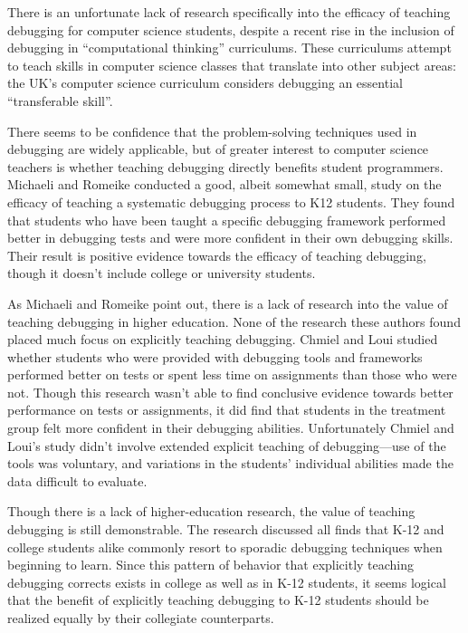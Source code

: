 \documentclass[12pt]{article}
\begin{document}
There is an unfortunate lack of research specifically into the
efficacy of teaching debugging for computer science students, despite
a recent rise in the inclusion of debugging in ``computational
thinking'' curriculums\cite{10.1145/3361721.3361724}.  These
curriculums attempt to teach skills in computer science classes that
translate into other subject areas: the UK's computer science
curriculum considers debugging an essential ``transferable
skill''\cite{10.1145/2602484}.\par

There seems to be confidence that the problem-solving techniques used
in debugging are widely applicable, but of greater interest to
computer science teachers is whether teaching debugging directly
benefits student programmers.  Michaeli and Romeike conducted a good,
albeit somewhat small, study on the efficacy of teaching a systematic
debugging process to K12 students.  They found that students who have
been taught a specific debugging framework performed better in
debugging tests and were more confident in their own debugging
skills\cite{10.1145/3361721.3361724}.  Their result is positive
evidence towards the efficacy of teaching debugging, though it doesn't
include college or university students.\par

As Michaeli and Romeike point out, there is a lack of research into
the value of teaching debugging in higher education.  None of the
research these authors found placed much focus on explicitly teaching
debugging.  Chmiel and Loui studied whether students who were provided
with debugging tools and frameworks performed better on tests or spent
less time on assignments than those who were
not\cite{10.1145/971300.971310}.  Though this research wasn't able to
find conclusive evidence towards better performance on tests or
assignments, it did find that students in the treatment group felt
more confident in their debugging abilities.  Unfortunately Chmiel and
Loui's study didn't involve extended explicit teaching of
debugging---use of the tools was voluntary, and variations in the
students' individual abilities made the data difficult to
evaluate.\par

Though there is a lack of higher-education research, the value of
teaching debugging is still demonstrable.  The research discussed all
finds that K-12 and college students alike commonly resort to sporadic
debugging techniques when beginning to learn.  Since this pattern of
behavior that explicitly teaching debugging corrects exists in college
as well as in K-12 students, it seems logical that the benefit of
explicitly teaching debugging to K-12 students should be realized
equally by their collegiate counterparts.\par
\end{document}
